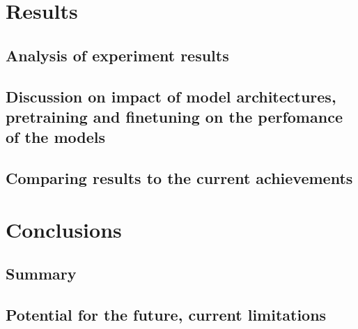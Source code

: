 \documentclass[a4paper,12pt]{report}
\begin{document}
\chapter{Results}
\section{Analysis of experiment results}
\section{Discussion on impact of model architectures, pretraining and finetuning on the perfomance of the models}
\section{Comparing results to the current achievements}


\chapter{Conclusions}
\section{Summary}
\section{Potential for the future, current limitations}



    
    
\end{document}
